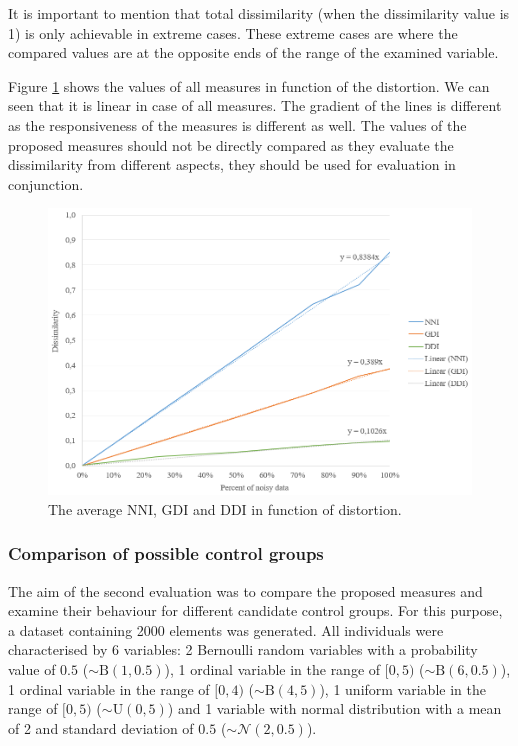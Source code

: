 	It is important to mention that total dissimilarity (when the dissimilarity value is 1) is only achievable in extreme cases. These extreme cases are where the compared values are at the opposite ends of the range of the examined variable.
	
	Figure \ref{fig:linear} shows the values of all measures in function of the distortion. We can seen that it is linear in case of all measures. The gradient of the lines is different as the responsiveness of the measures is different as well. The values of the proposed measures should not be directly compared as they evaluate the dissimilarity from different aspects, they should be used for evaluation in conjunction.
	     
	 				
	\begin{figure}[h]
		\centering
		\captionsetup{justification=centering}
		\includegraphics[width=0.75\linewidth]{assets/figures/control_group_selection/measures/linear.png}
		\caption{The average NNI, GDI and DDI in function of distortion.}
		\label{fig:linear}
	\end{figure} 
	
	\subsubsection{Comparison of possible control groups}
	\label{subseq:comparison}
					
	The aim of the second evaluation was to compare the proposed measures and examine their behaviour for different candidate control groups. For this purpose, a dataset containing 2000 elements was generated. All individuals were characterised by 6 variables: 2 Bernoulli random variables with a probability value of $0.5$ ($\mathtt{\sim} \textrm{B}(1, 0.5)$), 1 ordinal variable in the range of $[0,5)$ ($\mathtt{\sim} \textrm{B}(6, 0.5)$), 1 ordinal variable in the range of $[0,4)$ ($\mathtt{\sim} \textrm{B}(4, 5)$), 1 uniform variable in the range of $[0,5)$ ($\mathtt{\sim} \textrm{U}(0, 5)$) and 1 variable with normal distribution with a mean of 2 and standard deviation of $0.5$ ($\mathtt{\sim} \mathcal{N}(2, 0.5)$).
										
